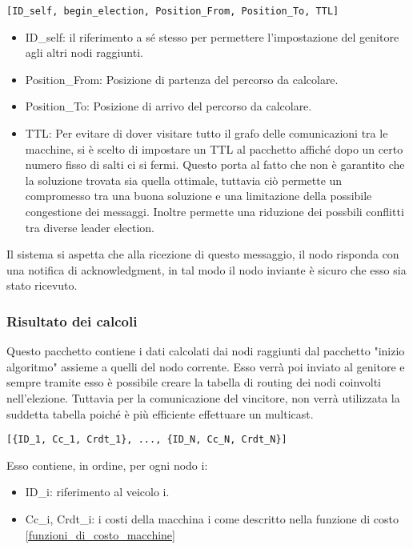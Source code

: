 \begin{lstlisting}
[ID_self, begin_election, Position_From, Position_To, TTL]
\end{lstlisting}

\begin{itemize}
	\item ID\_self: il riferimento a sé stesso per permettere l'impostazione del genitore agli altri nodi raggiunti.
	\item Position\_From: Posizione di partenza del percorso da calcolare.
	\item Position\_To: Posizione di arrivo del percorso da calcolare.
	\item TTL: Per evitare di dover visitare tutto il grafo delle comunicazioni tra le macchine, si è scelto di impostare un TTL al pacchetto affiché dopo un certo numero fisso di salti ci si fermi. Questo porta al fatto che non è garantito che la soluzione trovata sia quella ottimale, tuttavia ciò permette un compromesso tra una buona soluzione e una limitazione della possibile congestione dei messaggi. Inoltre permette una riduzione dei possbili conflitti tra diverse leader election.
\end{itemize}

Il sistema si aspetta che alla ricezione di questo messaggio, il nodo risponda con una notifica di acknowledgment, in tal modo il nodo inviante è sicuro che esso sia stato ricevuto.

\subsubsection{Risultato dei calcoli} \label{pacchetto_calcolato}
Questo pacchetto contiene i dati calcolati dai nodi raggiunti dal pacchetto "inizio algoritmo" assieme a quelli del nodo corrente. Esso verrà poi inviato al genitore e sempre tramite esso è possibile creare la tabella di routing dei nodi coinvolti nell'elezione. Tuttavia per la comunicazione del vincitore, non verrà utilizzata la suddetta tabella poiché è più efficiente effettuare un multicast.

\begin{lstlisting} 
[{ID_1, Cc_1, Crdt_1}, ..., {ID_N, Cc_N, Crdt_N}]
\end{lstlisting}

Esso contiene, in ordine, per ogni nodo i: 
\begin{itemize}
	\item ID\_i: riferimento al veicolo i.
	\item Cc\_i, Crdt\_i: i costi della macchina i come descritto nella funzione di costo \ref{funzioni_di_costo_macchine}
\end{itemize}


